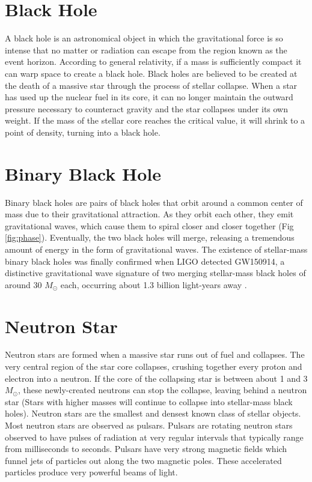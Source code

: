 \section{Black Hole}
A black hole is an astronomical object in which the gravitational force is so intense that no matter or radiation can escape from the region known as the event horizon. According to general relativity, if a mass is sufficiently compact it can warp space to create a black hole. Black holes are believed to be created at the death of a massive star through the process of stellar collapse. When a star has used up the nuclear fuel in its core, it can no longer maintain the outward pressure necessary to counteract gravity and the star collapses under its own weight. If the mass of the stellar core reaches the critical value, it will shrink to a point of density, turning into a black hole.

\section{Binary Black Hole}
Binary black holes are pairs of black holes that orbit around a common center of mass due to their gravitational attraction. As they orbit each other, they emit gravitational waves, which cause them to spiral closer and closer together (Fig \ref{fig:phase}). Eventually, the two black holes will merge, releasing a tremendous amount of energy in the form of gravitational waves. The existence of stellar-mass binary black holes was finally confirmed when LIGO detected GW150914, a distinctive gravitational wave signature of two merging stellar-mass black holes of around 30 $M_\odot$ each, occurring about 1.3 billion light-years away \citep{abbott2016observation}.

\section{Neutron Star}
Neutron stars are formed when a massive star runs out of fuel and collapses. The very central region of the star core collapses, crushing together every proton and electron into a neutron. If the core of the collapsing star is between about 1 and 3 $M_\odot$, these newly-created neutrons can stop the collapse, leaving behind a neutron star (Stars with higher masses will continue to collapse into stellar-mass black holes). Neutron stars are the smallest and densest known class of stellar objects. Most neutron stars are observed as pulsars. Pulsars are rotating neutron stars observed to have pulses of radiation at very regular intervals that typically range from milliseconds to seconds. Pulsars have very strong magnetic fields which funnel jets of particles out along the two magnetic poles. These accelerated particles produce very powerful beams of light.

